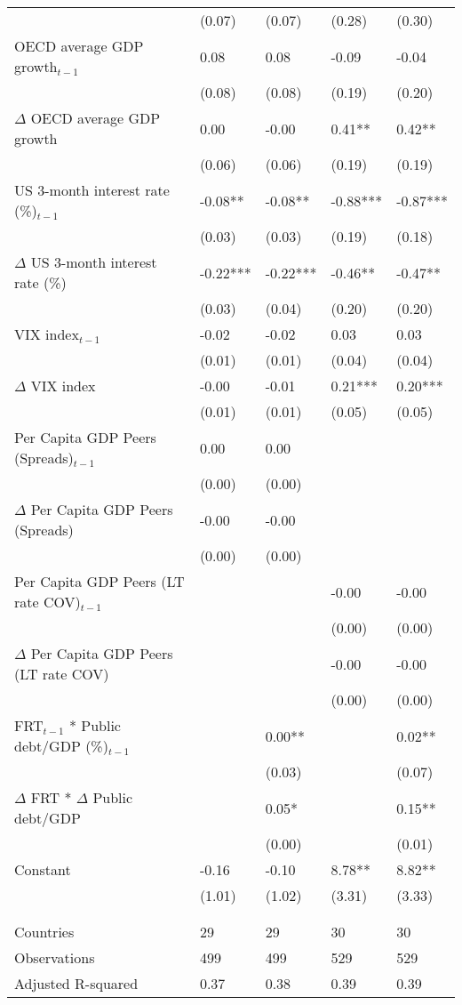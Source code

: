 \begin{tabular}{lp{3cm}p{3cm}p{3cm}p{3cm}}
   & (0.07) & (0.07) & (0.28) & (0.30) \\ 
  OECD average GDP growth$_{t-1}$ & 0.08 & 0.08 & -0.09 & -0.04 \\ 
   & (0.08) & (0.08) & (0.19) & (0.20) \\ 
  $\Delta$ OECD average GDP growth & 0.00 & -0.00 & 0.41** & 0.42** \\ 
   & (0.06) & (0.06) & (0.19) & (0.19) \\ 
  US 3-month interest rate (\%)$_{t-1}$ & -0.08** & -0.08** & -0.88*** & -0.87*** \\ 
   & (0.03) & (0.03) & (0.19) & (0.18) \\ 
  $\Delta$ US 3-month interest rate (\%) & -0.22*** & -0.22*** & -0.46** & -0.47** \\ 
   & (0.03) & (0.04) & (0.20) & (0.20) \\ 
  VIX index$_{t-1}$ & -0.02 & -0.02 & 0.03 & 0.03 \\ 
   & (0.01) & (0.01) & (0.04) & (0.04) \\ 
  $\Delta$ VIX index & -0.00 & -0.01 & 0.21*** & 0.20*** \\ 
   & (0.01) & (0.01) & (0.05) & (0.05) \\ 
  Per Capita GDP Peers (Spreads)$_{t-1}$ & 0.00 & 0.00 &  &  \\ 
   & (0.00) & (0.00) &  &  \\ 
  $\Delta$ Per Capita GDP Peers (Spreads) & -0.00 & -0.00 &  &  \\ 
   & (0.00) & (0.00) &  &  \\ 
  Per Capita GDP Peers (LT rate COV)$_{t-1}$ &  &  & -0.00 & -0.00 \\ 
   &  &  & (0.00) & (0.00) \\ 
  $\Delta$ Per Capita GDP Peers (LT rate COV) &  &  & -0.00 & -0.00 \\ 
   &  &  & (0.00) & (0.00) \\ 
  FRT$_{t-1}$ * Public debt/GDP (\%)$_{t-1}$ &  & 0.00** &  & 0.02** \\ 
   &  & (0.03) &  & (0.07) \\ 
  $\Delta$ FRT * $\Delta$ Public debt/GDP &  & 0.05* &  & 0.15** \\ 
   &  & (0.00) &  & (0.01) \\ 
  Constant & -0.16 & -0.10 & 8.78** & 8.82** \\ 
   & (1.01) & (1.02) & (3.31) & (3.33) \\ 
   &  &  &  &  \\ 
   &  &  &  &  \\ 
  Countries & 29 & 29 & 30 & 30 \\ 
  Observations & 499 & 499 & 529 & 529 \\ 
  Adjusted R-squared & 0.37 & 0.38 & 0.39 & 0.39 \\ 
   \hline
\end{tabular}
\endgroup
